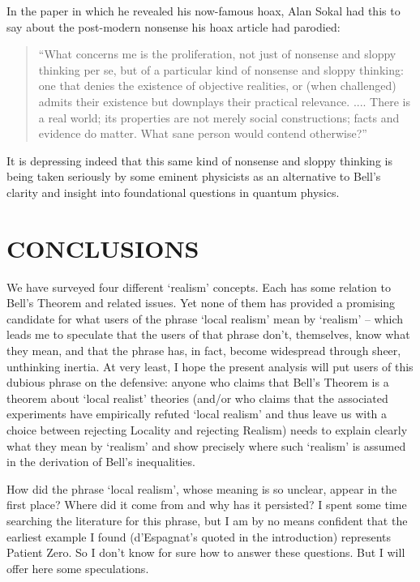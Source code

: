 \documentclass[12pt]{article}
\begin{document}
In the paper in which he revealed his now-famous hoax, Alan Sokal had
this to say about the post-modern nonsense his hoax article had parodied:
\begin{quote}
``What concerns me is the proliferation, not just of nonsense
and sloppy thinking per se, but of a particular kind of nonsense and
sloppy thinking:  one that denies the existence of objective realities,
or (when challenged) admits their existence but downplays their practical
relevance.  ....  There is a real world; its properties are not merely
social constructions; facts and evidence do matter.  What sane person
would contend otherwise?''\cite{sokal}
\end{quote}
It is depressing indeed that this same kind of nonsense and sloppy
thinking is being taken seriously by some eminent physicists
as an alternative to Bell's clarity and insight into foundational
questions in quantum physics.



\section{CONCLUSIONS}

We have surveyed four different `realism' concepts.  Each has some
relation to Bell's Theorem and related issues.  Yet none of them has
provided a promising candidate for what users of the phrase `local
realism' mean by `realism' -- which leads me to speculate that the
users of that phrase don't, themselves, know what they mean, and that
the phrase has, in fact, become widespread through sheer, unthinking
inertia.  At very least, I hope the present analysis will put users of
this dubious phrase on the defensive:  anyone who claims that Bell's
Theorem is a theorem about `local realist' theories (and/or who
claims that the associated experiments have empirically refuted
`local realism' and thus leave us with a choice between rejecting
Locality and rejecting Realism) needs to explain clearly what they 
mean by `realism' and show precisely where such `realism' is assumed
in the derivation of Bell's inequalities.

How did the phrase `local realism', 
whose meaning is so unclear, appear in the first
place?  Where did it come from and why has it persisted?  I spent some
time searching the literature for this phrase, but I am by no means
confident that the earliest example I found (d'Espagnat's quoted in
the introduction) represents Patient Zero.
So I don't know for sure how to answer these questions.  But I
will offer here some speculations.
\end{document}
